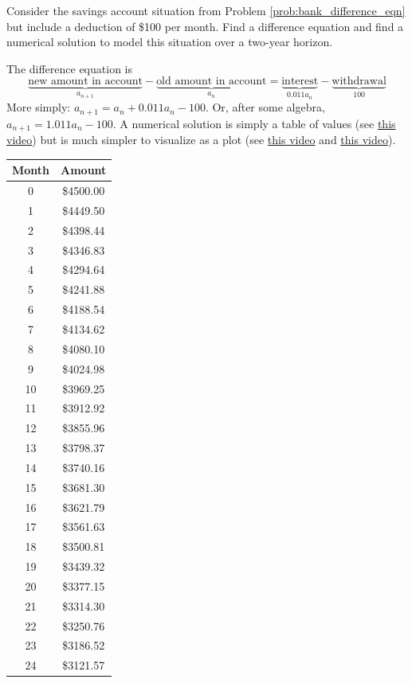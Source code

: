 \begin{example}
    Consider the savings account situation from Problem \ref{prob:bank_difference_eqn} but
    include a deduction of \$100 per month.  Find a difference equation and find a
    numerical solution to model this situation over a two-year horizon.

    The difference equation is
\[ \underbrace{\text{new amount in account}}_{a_{n+1}} - \underbrace{\text{old amount in
account}}_{a_n} = \underbrace{\text{interest}}_{0.011a_n} -
\underbrace{\text{withdrawal}}_{100} \]
More simply: $a_{n+1} = a_n + 0.011a_n - 100$.  Or, after some algebra, $a_{n+1} = 1.011a_n
- 100$.  A numerical solution is simply a table of values (see
\href{https://www.youtube.com/watch?v=kVx7bZTP9L4}{this video}) but is much simpler to
visualize as a plot (see 
\href{https://www.youtube.com/watch?v=k3bwXAeQsKo}{this video} and
\href{https://www.youtube.com/watch?v=g6OGCmvxCHQ}{this video}).

\end{example}
\begin{minipage}{0.45\columnwidth}
    \begin{center}
        \begin{tabular}{|c|c|}
            \hline
            Month & Amount \\ \hline \hline
            0  &\$4500.00\\
            1  &\$4449.50\\
            2  &\$4398.44\\
            3  &\$4346.83\\
            4  &\$4294.64\\
            5  &\$4241.88\\
            6  &\$4188.54\\
            7  &\$4134.62\\
            8  &\$4080.10\\
            9  &\$4024.98\\
            10 &\$3969.25\\
            11 &\$3912.92\\
            12 &\$3855.96\\
            13 &\$3798.37\\
            14 &\$3740.16\\
            15 &\$3681.30\\
            16 &\$3621.79\\
            17 &\$3561.63\\
            18 &\$3500.81\\
            19 &\$3439.32\\
            20 &\$3377.15\\
            21 &\$3314.30\\
            22 &\$3250.76\\
            23 &\$3186.52\\
            24 &\$3121.57\\\hline
        \end{tabular}
    \end{center}
\end{minipage}
